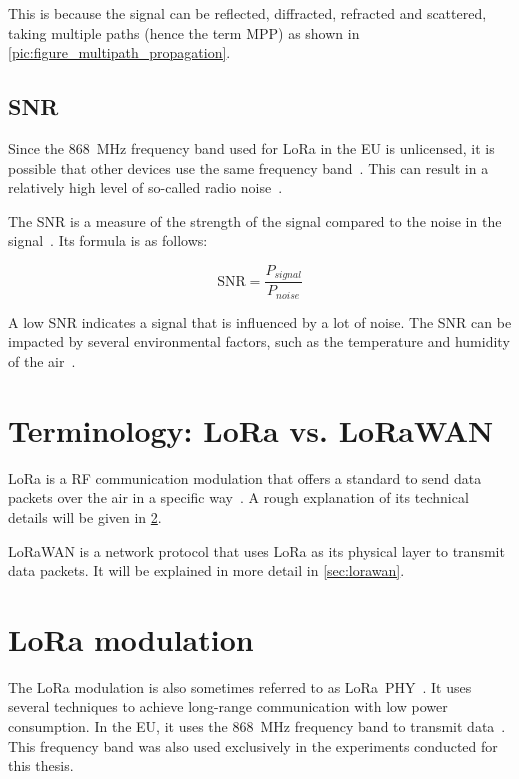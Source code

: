 This is because the signal can be reflected, diffracted, refracted and scattered, taking multiple paths (hence the term \acl{MPP}) as shown in \cref{pic:figure_multipath_propagation}.

\subsection{\acf{SNR}}\label{sec:background-snr}

Since the \SI{868}{\mega\hertz} frequency band used for \ac{LoRa} in the \ac{EU} is unlicensed, it is possible that other devices use the same frequency band~\cite{etsi_etsi_2012}.
This can result in a relatively high level of so-called radio noise~\cite[p. 6]{fujdiak_insights_2022}.

The \acf{SNR} is a measure of the strength of the signal compared to the noise in the signal~\cite{johnson_signal--noise_2006}.
Its formula is as follows:

\begin{equation}
    \text{SNR} = \frac{P_{signal}}{P_{noise}}
\end{equation}

A low \ac{SNR} indicates a signal that is influenced by a lot of noise.
The \ac{SNR} can be impacted by several environmental factors, such as the temperature and humidity of the air~\cite{jeftenic_impact_2020}.

\section{Terminology: \acs{LoRa} vs. \acs{LoRaWAN}}

\acf{LoRa} is a \ac{RF} communication modulation that offers a standard to send data packets over the air in a specific way~\cite{semtech_corporation_lora_2023}.
A rough explanation of its technical details will be given in \cref{sec:lora-modulation}.

\ac{LoRaWAN} is a network protocol that uses \ac{LoRa} as its physical layer to transmit data packets.
It will be explained in more detail in \cref{sec:lorawan}.

\section{\acf{LoRa} modulation}\label{sec:lora-modulation}

The \ac{LoRa} modulation is also sometimes referred to as \ac{LoRa}\ PHY~\cite{chaudhari_understanding_2022}.
It uses several techniques to achieve long-range communication with low power consumption.
In the \ac{EU}, it uses the \SI{868}{\mega\hertz} frequency band to transmit data~\cite{lora_alliance_inc_lorawan_regional_2017}.
This frequency band was also used exclusively in the experiments conducted for this thesis.

